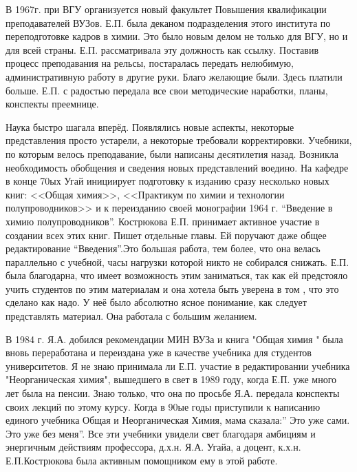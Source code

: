 В 1967г. при ВГУ организуется новый факультет Повышения квалификации преподавателей ВУЗов. Е.П. была деканом подразделения этого института по переподготовке кадров в химии. Это было новым делом не только для ВГУ, но и для всей страны. Е.П. рассматривала эту должность как ссылку. Поставив процесс преподавания на рельсы, постаралась передать нелюбимую, административную работу в другие руки. Благо желающие были. Здесь платили больше. Е.П. с радостью передала все свои методические наработки, планы, конспекты преемнице.

Наука быстро шагала вперёд.
Появлялись новые аспекты, некоторые представления просто устарели, а некоторые требовали корректировки.
Учебники, по которым велось преподавание, были написаны десятилетия назад.
Возникла необходимость обобщения и сведения новых представлений воедино.
На кафедре в конце 70ых Угай инициирует подготовку к изданию сразу несколько новых книг:
<<Общая химия>>, <<Практикум по химии и технологии полупроводников>> и к переизданию своей монографии 1964 г. “Введение в химию полупроводников”. Кострюкова Е.П. принимает активное участие в создании всех этих книг. Пишет отдельные главы. Ей поручают даже общее редактирование “Введения”.Это большая работа, тем более, что она велась параллельно с учебной, часы нагрузки которой никто не собирался снижать. Е.П. была благодарна, что имеет возможность этим заниматься, так как ей предстояло учить студентов по этим материалам и она хотела быть уверена в том , что это сделано как надо. У неё было абсолютно ясное понимание, как следует представлять материал. Она работала с большим желанием.

В 1984 г. Я.А. добился рекомендации МИН ВУЗа и книга "Общая химия " была вновь переработана и переиздана уже в качестве учебника для студентов университетов. Я не знаю принимала ли Е.П. участие в редактировании учебника "Неорганическая химия", вышедшего в свет в 1989 году, когда Е.П. уже много лет была на пенсии. Знаю только, что она по просьбе Я.А. передала конспекты своих лекций по этому курсу. Когда в 90ые годы приступили к написанию единого учебника Общая и Неорганическая Химия, мама сказала:” Это уже сами. Это уже без меня”. Все эти учебники увидели свет благодаря амбициям и энергичным действиям профессора, д.х.н. Я.А. Угайа, а доцент, к.х.н. Е.П.Кострюкова была активным помощником ему в этой работе.

